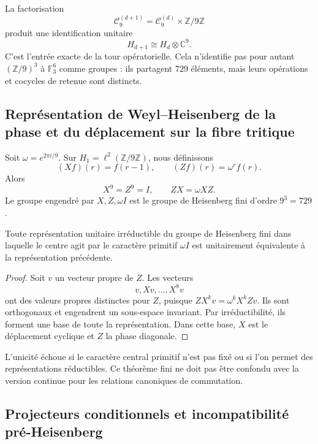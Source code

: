 La factorisation
\[
  \mathcal C_9^{(d+1)}
  =
  \mathcal C_9^{(d)}\times\mathbb Z/9\mathbb Z
\]
produit une identification unitaire
\[
  H_{d+1}\cong H_d\otimes\mathbb C^9.
\]
C’est l’entrée exacte de la tour opératorielle. Cela n’identifie pas pour autant
\((\mathbb Z/9)^3\) à \(\mathbb F_3^6\) comme groupes : ils partagent \(729\)
éléments, mais leurs opérations et cocycles de retenue sont distincts.

\subsection{Représentation de Weyl–Heisenberg de la phase et du déplacement sur la fibre tritique}

Soit \(\omega=e^{2\pi i/9}\). Sur
\(H_1=\ell^2(\mathbb Z/9\mathbb Z)\), nous définissons
\[
  (Xf)(r)=f(r-1),
  \qquad
  (Zf)(r)=\omega^r f(r).
\]
Alors
\[
  X^9=Z^9=I,
  \qquad
  ZX=\omega XZ.
\]
Le groupe engendré par \(X,Z,\omega I\) est le groupe de Heisenberg fini
d’ordre \(9^3=729\).

\begin{theorem}
Toute représentation unitaire irréductible du groupe de Heisenberg fini dans
laquelle le centre agit par le caractère primitif
\(\omega I\) est unitairement équivalente à la représentation précédente.
\end{theorem}

\begin{proof}
Soit \(v\) un vecteur propre de \(Z\). Les vecteurs
\[
  v,Xv,\ldots,X^8v
\]
ont des valeurs propres distinctes pour \(Z\), puisque
\(ZX^kv=\omega^kX^kZv\). Ils sont orthogonaux et engendrent un sous-espace
invariant. Par irréductibilité, ils forment une base de toute la représentation.
Dans cette base, \(X\) est le déplacement cyclique et \(Z\) la phase diagonale.
\end{proof}

\begin{controlbox}
L’unicité échoue si le caractère central primitif n’est pas fixé ou si l’on
permet des représentations réductibles. Ce théorème fini ne doit pas être confondu
avec la version continue pour les relations canoniques de commutation.
\end{controlbox}

\subsection{Projecteurs conditionnels et incompatibilité pré-Heisenberg}

